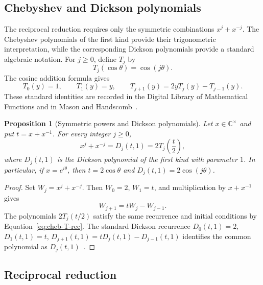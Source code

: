 \documentclass[11pt,a4paper]{article}
\numberwithin{equation}{section}
\theoremstyle{uprightpaper}
\newtheorem{proposition}{Proposition}[section]
\newcommand{\C}{\mathbb{C}}
\begin{document}
\subsection{Chebyshev and Dickson polynomials}\label{subsec:chebyshev}

The reciprocal reduction requires only the symmetric combinations $x^j+x^{-j}$. The Chebyshev polynomials of the first kind provide their trigonometric interpretation, while the corresponding Dickson polynomials provide a standard algebraic notation. For $j\ge0$, define $T_j$ by
\begin{equation}\label{eq:cheb-first}
 T_j(\cos\theta)=\cos(j\theta).
\end{equation}
The cosine addition formula gives
\begin{equation}\label{eq:cheb-T-rec}
 T_0(y)=1,\qquad T_1(y)=y,\qquad T_{j+1}(y)=2yT_j(y)-T_{j-1}(y).
\end{equation}
These standard identities are recorded in the Digital Library of Mathematical Functions and in Mason and Handscomb~\cite{dlmfchebyshev,masonhandscomb2003}.

\begin{proposition}[Symmetric powers and Dickson polynomials]\label{prop:cheb-symmetric}
Let $x\in\C^\times$ and put $t=x+x^{-1}$. For every integer $j\ge0$,
\begin{equation}\label{eq:cheb-lift}
 x^j+x^{-j}=D_j(t,1)=2T_j\!\left(\frac{t}{2}\right),
\end{equation}
where $D_j(t,1)$ is the Dickson polynomial of the first kind with parameter $1$. In particular, if $x=e^{i\theta}$, then $t=2\cos\theta$ and $D_j(t,1)=2\cos(j\theta)$.
\end{proposition}
\begin{proof}
Set $W_j=x^j+x^{-j}$. Then $W_0=2$, $W_1=t$, and multiplication by $x+x^{-1}$ gives
\begin{equation}\label{eq:cheb-symmetric-rec}
 W_{j+1}=tW_j-W_{j-1}.
\end{equation}
The polynomials $2T_j(t/2)$ satisfy the same recurrence and initial conditions by Equation~\eqref{eq:cheb-T-rec}. The standard Dickson recurrence $D_0(t,1)=2$, $D_1(t,1)=t$, $D_{j+1}(t,1)=tD_j(t,1)-D_{j-1}(t,1)$ identifies the common polynomial as $D_j(t,1)$~\cite{lidl1993}.
\end{proof}

\subsection{Reciprocal reduction}\label{sec:reciprocalmethod}
\end{document}
